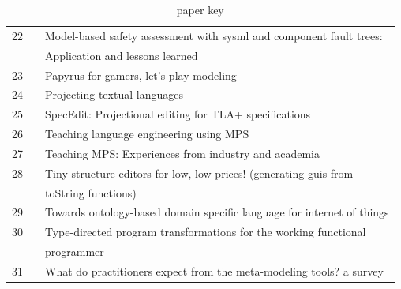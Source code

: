 \begin{table}[htbp]
\begin{center}
\begin{tabular}{ |c  c|l | }
            22  & \cite{munk2020model_SLR}               & Model-based safety assessment with sysml and component fault trees:         \\
                &                                        & Application and lessons learned                                             \\ \hline
            23  & \cite{bucchiarone2020papyrus_SLR}      & Papyrus for gamers, let’s play modeling                                     \\ \hline
            24  & \cite{merino2021projecting_SLR}        & Projecting textual languages                                                \\ \hline
            25  & \cite{cuinat2020specedit_SLR}          & SpecEdit: Projectional editing for TLA+ specifications                      \\ \hline
            26  & \cite{prinz2021teaching_SLR}           & Teaching language engineering using MPS                                     \\ \hline
            27  & \cite{barash2021teaching_SLR}          & Teaching MPS: Experiences from industry and academia                        \\ \hline
            28  & \cite{hempel2020tiny_SLR}              & Tiny structure editors for low, low prices! (generating guis from           \\
                &                                        & toString functions)                                                         \\ \hline
            29  & \cite{negm2020towards_SLR}             & Towards ontology-based domain specific language for internet of things      \\ \hline
            30  & \cite{lubin2020type_SLR}               & Type-directed program transformations for the working functional            \\
                &                                        & programmer                                                                  \\ \hline
            31  & \cite{ozkaya2021practitioners_SLR}     & What do practitioners expect from the meta-modeling tools? a survey         \\ \hline
        \end{tabular}
    \end{center}
    \caption{paper key}
    \label{table:paper_key}
\end{table}

